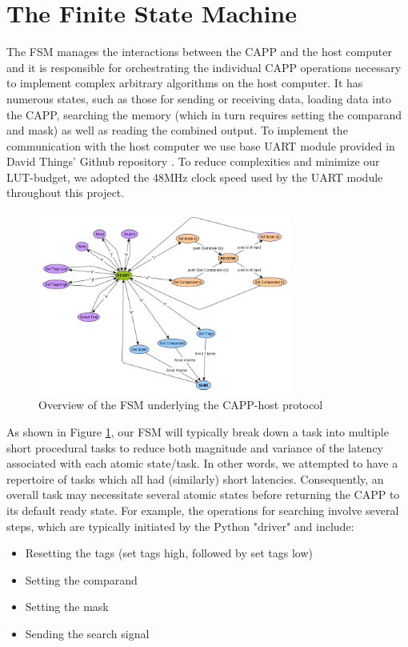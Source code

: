 \section{The Finite State Machine}
The FSM manages the interactions between the CAPP and the host computer and it is responsible for orchestrating the individual CAPP operations necessary to implement complex arbitrary algorithms on the host computer.
It has numerous states, such as those for sending or receiving data, loading data into the CAPP, searching the memory (which in turn requires setting the comparand and mask) as well as reading the combined output. To implement the communication with the host computer we use base UART module provided in David Things' Github repository \cite{uart}. To reduce complexities and minimize our LUT-budget, we adopted the 48MHz clock speed used by the UART module throughout this project. 

\begin{figure}
  \includegraphics[height=6cm]{FPGA-CAPP_research_paper/images/protocol.png}
  \caption{Overview of the FSM underlying the CAPP-host protocol}
  \label{FSM_protocol}
\end{figure}

As shown in Figure \ref{FSM_protocol}, our FSM will typically break down a task into multiple short procedural tasks to reduce both magnitude and variance of the latency associated with each atomic state/task. In other words, we attempted to have a repertoire of tasks which all had (similarly) short latencies. Consequently, an overall task may necessitate several atomic states before returning the CAPP to its default ready state. 
For example, the operations for searching involve several steps, which are typically initiated by the Python "driver" and include:

\begin{itemize}
    \item Resetting the tags (set tags high, followed by set tags low)
    \item Setting the comparand 
    \item Setting the mask 
    \item Sending the search signal 
\end{itemize}

